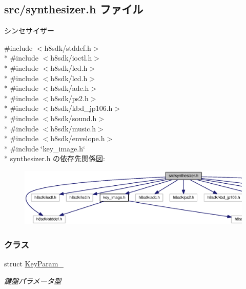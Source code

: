 \subsection{src/synthesizer.h ファイル}
\label{synthesizer_8h}


シンセサイザー  


{\ttfamily \#include $<$h8sdk/stddef.\+h$>$}\\*
{\ttfamily \#include $<$h8sdk/ioctl.\+h$>$}\\*
{\ttfamily \#include $<$h8sdk/led.\+h$>$}\\*
{\ttfamily \#include $<$h8sdk/lcd.\+h$>$}\\*
{\ttfamily \#include $<$h8sdk/adc.\+h$>$}\\*
{\ttfamily \#include $<$h8sdk/ps2.\+h$>$}\\*
{\ttfamily \#include $<$h8sdk/kbd\+\_\+jp106.\+h$>$}\\*
{\ttfamily \#include $<$h8sdk/sound.\+h$>$}\\*
{\ttfamily \#include $<$h8sdk/music.\+h$>$}\\*
{\ttfamily \#include $<$h8sdk/envelope.\+h$>$}\\*
{\ttfamily \#include \char`\"{}key\+\_\+image.\+h\char`\"{}}\\*
synthesizer.\+h の依存先関係図\+:\nopagebreak
\begin{figure}[H]
\begin{center}
\leavevmode
\includegraphics[width=350pt]{db/dbc/synthesizer_8h__incl}
\end{center}
\end{figure}
\subsubsection*{クラス}
\begin{DoxyCompactItemize}
\item 
struct \hyperlink{synthesizer_8h_db/d8e/structKeyParam__}{Key\+Param\+\_\+}
\begin{DoxyCompactList}\small\item\em 鍵盤パラメータ型 \end{DoxyCompactList}\end{DoxyCompactItemize}
